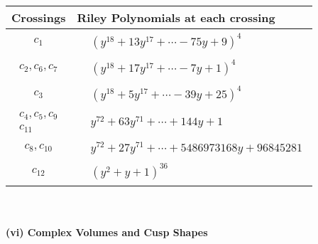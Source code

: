 \documentclass[1p]{elsarticle_modified}
\theoremstyle{definition}
\begin{document}
\begin{tabular}{m{50pt}|m{274pt}}
Crossings & \hspace{64pt}Riley Polynomials at each crossing \\
\hline $$\begin{aligned}c_{1}\end{aligned}$$&$\begin{aligned}
&(y^{18}+13 y^{17}+\cdots-75 y+9)^{4}
\end{aligned}$\\
\hline $$\begin{aligned}c_{2},c_{6},c_{7}\end{aligned}$$&$\begin{aligned}
&(y^{18}+17 y^{17}+\cdots-7 y+1)^{4}
\end{aligned}$\\
\hline $$\begin{aligned}c_{3}\end{aligned}$$&$\begin{aligned}
&(y^{18}+5 y^{17}+\cdots-39 y+25)^{4}
\end{aligned}$\\
\hline $$\begin{aligned}c_{4},c_{5},c_{9}\\c_{11}\end{aligned}$$&$\begin{aligned}
&y^{72}+63 y^{71}+\cdots+144 y+1
\end{aligned}$\\
\hline $$\begin{aligned}c_{8},c_{10}\end{aligned}$$&$\begin{aligned}
&y^{72}+27 y^{71}+\cdots+5486973168 y+96845281
\end{aligned}$\\
\hline $$\begin{aligned}c_{12}\end{aligned}$$&$\begin{aligned}
&(y^2+y+1)^{36}
\end{aligned}$\\
\hline
\end{tabular}\\~\\
\newpage\flushleft \textbf{(vi) Complex Volumes and Cusp Shapes}
\end{document}
